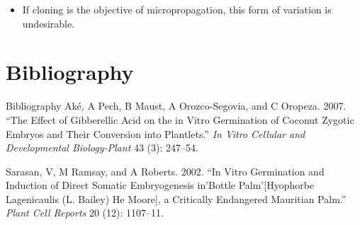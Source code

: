 \documentclass[
  ignorenonframetext,
  aspectratio=169]{beamer}
\providecommand{\tightlist}{%
  \setlength{\itemsep}{0pt}\setlength{\parskip}{0pt}}
\newlength{\cslhangindent}
\newenvironment{cslreferences}%
  {\setlength{\parindent}{0pt}%
  \everypar{\setlength{\hangindent}{\cslhangindent}}\ignorespaces}%
  {\par}
\begin{document}
\begin{frame}{}
\protect\hypertarget{section-20}{}
\begin{itemize}
\tightlist
\item
  If cloning is the objective of micropropagation, this form of
  variation is undesirable.
\end{itemize}
\end{frame}

\hypertarget{bibliography}{%
\section*{Bibliography}\label{bibliography}}

\begin{frame}{Bibliography}
\hypertarget{refs}{}
\begin{cslreferences}
\leavevmode\hypertarget{ref-ake2007effect}{}%
Aké, A Pech, B Maust, A Orozco-Segovia, and C Oropeza. 2007. ``The
Effect of Gibberellic Acid on the in Vitro Germination of Coconut
Zygotic Embryos and Their Conversion into Plantlets.'' \emph{In Vitro
Cellular and Developmental Biology-Plant} 43 (3): 247--54.

\leavevmode\hypertarget{ref-sarasan2002vitro}{}%
Sarasan, V, M Ramsay, and A Roberts. 2002. ``In Vitro Germination and
Induction of Direct Somatic Embryogenesis in'Bottle Palm'{[}Hyophorbe
Lagenicaulis (L. Bailey) He Moore{]}, a Critically Endangered Mauritian
Palm.'' \emph{Plant Cell Reports} 20 (12): 1107--11.
\end{cslreferences}
\end{frame}
\end{document}
